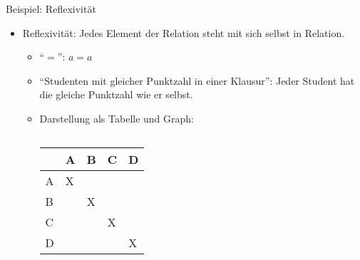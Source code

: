 \begin{frame}{Beispiel: Reflexivität}
	\begin{itemize}
		\item Reflexivität: Jedes Element der Relation steht mit sich selbst in Relation.
		\begin{itemize}
			\item "`$=$"': $a=a$
			\item "`Studenten mit gleicher Punktzahl in einer Klausur"': Jeder Student hat die gleiche Punktzahl wie er selbst.
			\item Darstellung als Tabelle und Graph:\\
			\vspace{1em}
				\begin{columns}
				\begin{tabularx}{\textwidth}{|Y|Y|Y|Y|Y|}
					\hline
					& A & B & C & D \\
					\hline
					A & X &  &  &  \\
					\hline
					B &  & X &  &  \\
					\hline
					C &  &  & X &  \\
					\hline
					D &  &  &  & X \\
					\hline
				\end{tabularx}
			\end{columns}
		\end{itemize}
	\end{itemize}	
\end{frame}

